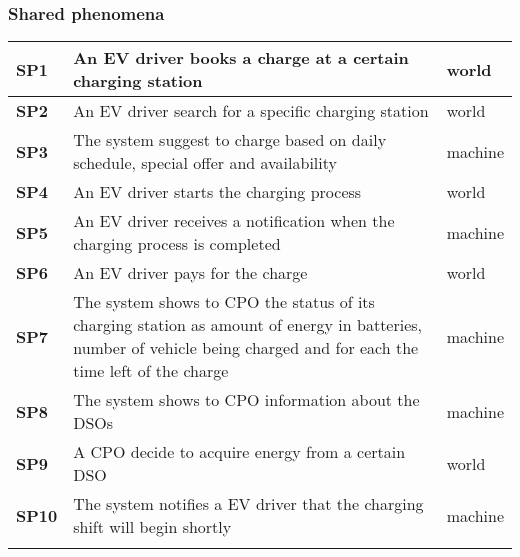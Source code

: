 \subsubsection*{Shared phenomena}
\begin{table}[h]
    \begin{tabular}{|l|l|l|}
        \toprule
        \textbf{SP1} & An EV driver books a charge at a certain charging station                                                                                                             & world   \\ \midrule
        \textbf{SP2} & An EV driver search for a specific charging station                                                                                                                   & world   \\ \midrule
        \textbf{SP3} & The system suggest to charge based on daily schedule, special offer and availability                                                                                  & machine \\ \midrule
        \textbf{SP4} & An EV driver starts the charging process                                                                                                                              & world   \\ \midrule
        \textbf{SP5} & An EV driver receives a notification when the charging process is completed                                                                                           & machine \\ \midrule
        \textbf{SP6} & An EV driver pays for the charge                                                                                                                                      & world   \\ \midrule
        \textbf{SP7} & The system shows to CPO the status of its charging station as amount of energy in batteries, number of vehicle being charged and for each the time left of the charge & machine \\ \midrule
        \textbf{SP8} & The system shows to CPO information about the DSOs                                                                                                                    & machine \\ \midrule
        \textbf{SP9} & A CPO decide to acquire energy from a certain DSO                                                                                                                     & world   \\ \midrule
        \textbf{SP10} & The system notifies a EV driver that the charging shift will begin shortly                                                                                            & machine \\ \midrule
                     &                                                                                                                                                                                 \\ \bottomrule
    \end{tabular}
\end{table}


